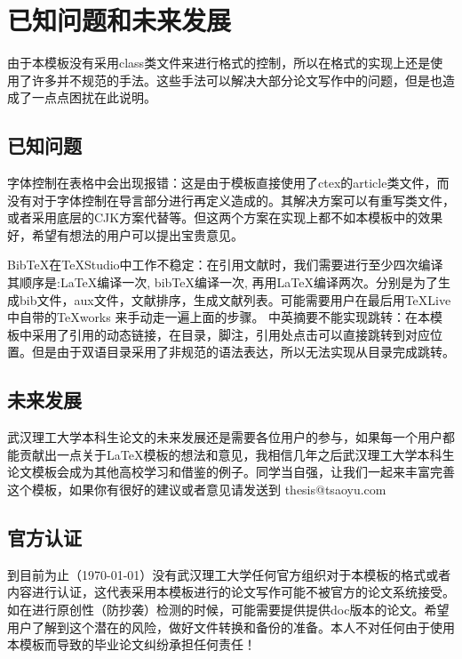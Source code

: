 \section{已知问题和未来发展}
由于本模板没有采用class类文件来进行格式的控制，所以在格式的实现上还是使用了许多并不规范的手法。这些手法可以解决大部分论文写作中的问题，但是也造成了一点点困扰在此说明。
\subsection{已知问题}
字体控制在表格中会出现报错：这是由于模板直接使用了ctex的article类文件，而没有对于字体控制在导言部分进行再定义造成的。其解决方案可以有重写类文件，或者采用底层的CJK方案代替等。但这两个方案在实现上都不如本模板中的效果好，希望有想法的用户可以提出宝贵意见。

Bib\TeX 在\TeX Studio中工作不稳定：在引用文献时，我们需要进行至少四次编译其顺序是:\LaTeX 编译一次, bib\TeX 编译一次, 再用\LaTeX 编译两次。分别是为了生成bib文件，aux文件，文献排序，生成文献列表。可能需要用户在最后用\TeX Live 中自带的\TeX works 来手动走一遍上面的步骤。
中英摘要不能实现跳转：在本模板中采用了引用的动态链接，在目录，脚注，引用处点击可以直接跳转到对应位置。但是由于双语目录采用了非规范的语法表达，所以无法实现从目录完成跳转。
\subsection{未来发展}
武汉理工大学本科生论文的未来发展还是需要各位用户的参与，如果每一个用户都能贡献出一点关于\LaTeX 模板的想法和意见，我相信几年之后武汉理工大学本科生论文模板会成为其他高校学习和借鉴的例子。同学当自强，让我们一起来丰富完善这个模板，如果你有很好的建议或者意见请发送到 thesis@tsaoyu.com
\subsection{官方认证}
到目前为止（\today ）没有武汉理工大学任何官方组织对于本模板的格式或者内容进行认证，这代表采用本模板进行的论文写作可能不被官方的论文系统接受。如在进行原创性（防抄袭）检测的时候，可能需要提供提供doc版本的论文。希望用户了解到这个潜在的风险，做好文件转换和备份的准备。本人不对任何由于使用本模板而导致的毕业论文纠纷承担任何责任！